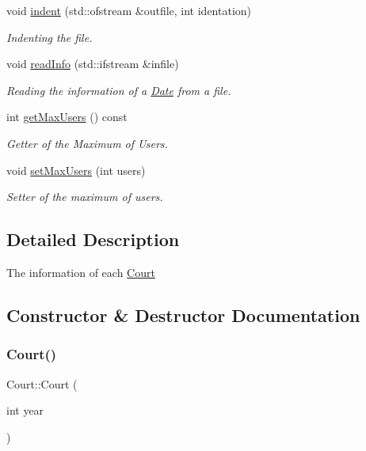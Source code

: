 \begin{DoxyCompactItemize}
void \mbox{\hyperlink{class_court_ae08f3e2f1119073fffc251fc1e725550}{indent}} (std\+::ofstream \&outfile, int identation)
\begin{DoxyCompactList}\small\item\em Indenting the file. \end{DoxyCompactList}\item 
void \mbox{\hyperlink{class_court_a2d801d3edd9d0280ef0420b131e07f2e}{read\+Info}} (std\+::ifstream \&infile)
\begin{DoxyCompactList}\small\item\em Reading the information of a \mbox{\hyperlink{class_date}{Date}} from a file. \end{DoxyCompactList}\item 
int \mbox{\hyperlink{class_court_a9992ef2a5d2ee81e8cc7f24f8c917f31}{get\+Max\+Users}} () const
\begin{DoxyCompactList}\small\item\em Getter of the Maximum of Users. \end{DoxyCompactList}\item 
void \mbox{\hyperlink{class_court_ae44417638404c3caf4579104e633a2f4}{set\+Max\+Users}} (int users)
\begin{DoxyCompactList}\small\item\em Setter of the maximum of users. \end{DoxyCompactList}\end{DoxyCompactItemize}


\subsection{Detailed Description}
The information of each \mbox{\hyperlink{class_court}{Court}} 

\subsection{Constructor \& Destructor Documentation}
\mbox{\label{class_court_a594463e426e762163a09290e48d1d437}} 
\subsubsection{\texorpdfstring{Court()}{Court()}}
{\footnotesize\ttfamily Court\+::\+Court (\begin{DoxyParamCaption}\item[{int}]{year }\end{DoxyParamCaption})}



